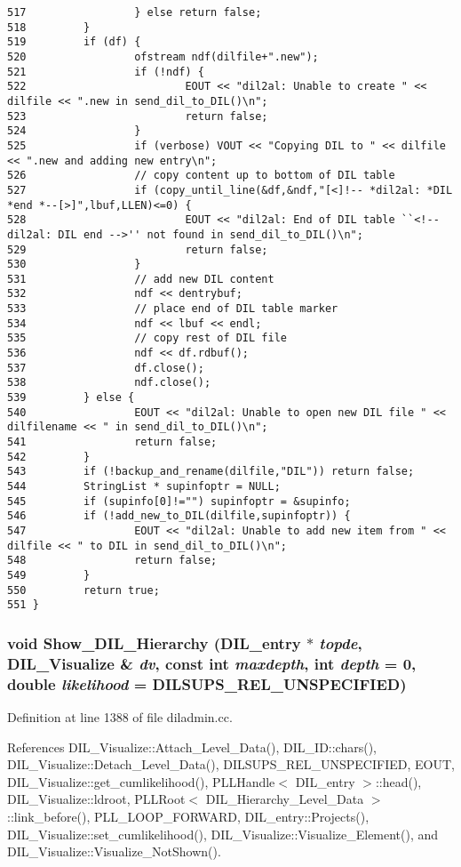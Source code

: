 \begin{verbatim}
517                 } else return false;
518         }
519         if (df) {
520                 ofstream ndf(dilfile+".new");
521                 if (!ndf) {
522                         EOUT << "dil2al: Unable to create " << dilfile << ".new in send_dil_to_DIL()\n";
523                         return false;
524                 }
525                 if (verbose) VOUT << "Copying DIL to " << dilfile << ".new and adding new entry\n";
526                 // copy content up to bottom of DIL table
527                 if (copy_until_line(&df,&ndf,"[<]!-- *dil2al: *DIL *end *--[>]",lbuf,LLEN)<=0) {
528                         EOUT << "dil2al: End of DIL table ``<!-- dil2al: DIL end -->'' not found in send_dil_to_DIL()\n";
529                         return false;
530                 }
531                 // add new DIL content
532                 ndf << dentrybuf;
533                 // place end of DIL table marker
534                 ndf << lbuf << endl;
535                 // copy rest of DIL file
536                 ndf << df.rdbuf();
537                 df.close();
538                 ndf.close();
539         } else {
540                 EOUT << "dil2al: Unable to open new DIL file " << dilfilename << " in send_dil_to_DIL()\n";
541                 return false;
542         }
543         if (!backup_and_rename(dilfile,"DIL")) return false;
544         StringList * supinfoptr = NULL;
545         if (supinfo[0]!="") supinfoptr = &supinfo;
546         if (!add_new_to_DIL(dilfile,supinfoptr)) {
547                 EOUT << "dil2al: Unable to add new item from " << dilfile << " to DIL in send_dil_to_DIL()\n";
548                 return false;
549         }
550         return true;
551 }
\end{verbatim}\normalsize 
{}
\subsubsection{\setlength{\rightskip}{0pt plus 5cm}void Show\_\-DIL\_\-Hierarchy ({\bf DIL\_\-entry} $\ast$ {\em topde}, {\bf DIL\_\-Visualize} \& {\em dv}, const int {\em maxdepth}, int {\em depth} = 0, double {\em likelihood} = DILSUPS\_\-REL\_\-UNSPECIFIED)}\label{diladmin_8cc_a20}




Definition at line 1388 of file diladmin.cc.

References DIL\_\-Visualize::Attach\_\-Level\_\-Data(), DIL\_\-ID::chars(), DIL\_\-Visualize::Detach\_\-Level\_\-Data(), DILSUPS\_\-REL\_\-UNSPECIFIED, EOUT, DIL\_\-Visualize::get\_\-cumlikelihood(), PLLHandle$<$ DIL\_\-entry $>$::head(), DIL\_\-Visualize::ldroot, PLLRoot$<$ DIL\_\-Hierarchy\_\-Level\_\-Data $>$::link\_\-before(), PLL\_\-LOOP\_\-FORWARD, DIL\_\-entry::Projects(), DIL\_\-Visualize::set\_\-cumlikelihood(), DIL\_\-Visualize::Visualize\_\-Element(), and DIL\_\-Visualize::Visualize\_\-Not\-Shown().

